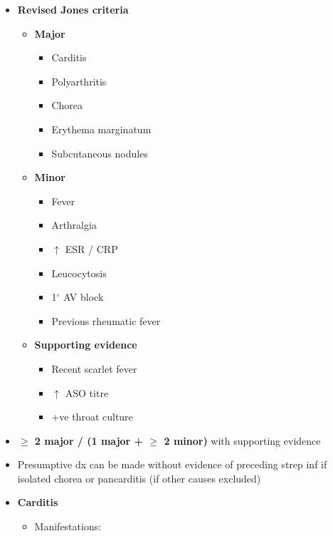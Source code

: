 \documentclass[
  12pt,
]{memoir}
\providecommand{\tightlist}{%
  \setlength{\itemsep}{0pt}\setlength{\parskip}{0pt}}
\begin{document}
\begin{itemize}
\tightlist
\item
  \textbf{Revised Jones criteria}

  \begin{itemize}
  \tightlist
  \item
    \textbf{Major}

    \begin{itemize}
    \tightlist
    \item
      Carditis
    \item
      Polyarthritis
    \item
      Chorea
    \item
      Erythema marginatum
    \item
      Subcutaneous nodules
    \end{itemize}
  \item
    \textbf{Minor}

    \begin{itemize}
    \tightlist
    \item
      Fever
    \item
      Arthralgia
    \item
      \(\uparrow\) ESR / CRP
    \item
      Leucocytosis
    \item
      1\(^\circ\) AV block
    \item
      Previous rheumatic fever
    \end{itemize}
  \item
    \textbf{Supporting evidence}

    \begin{itemize}
    \tightlist
    \item
      Recent scarlet fever
    \item
      \(\uparrow\) ASO titre
    \item
      +ve throat culture
    \end{itemize}
  \end{itemize}
\item
  \textbf{\(\boldsymbol\ge\) 2 major / (1 major + \(\boldsymbol\ge\) 2
  minor)} with supporting evidence
\item
  Presumptive dx can be made without evidence of preceding strep inf if
  isolated chorea or pancarditis (if other causes excluded)
\item
  \textbf{Carditis}

  \begin{itemize}
  \tightlist
  \item
    Manifestations:


\end{itemize}
\end{itemize}
\end{document}
